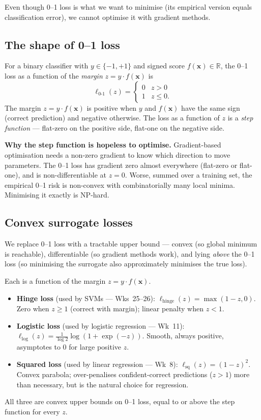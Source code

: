 \documentclass[11pt, a4paper]{article}
\begin{document}
Even though 0--1 loss is what we want to minimise (its empirical version equals classification error), we cannot optimise it with gradient methods.

\subsection{The shape of 0--1 loss}

For a binary classifier with $y \in \{-1, +1\}$ and signed score $f(\mathbf{x}) \in \mathbb{R}$, the 0--1 loss as a function of the \emph{margin} $z = y \cdot f(\mathbf{x})$ is
\[
\ell_{0\text{-}1}(z) = \begin{cases} 0 & z > 0 \\ 1 & z \le 0. \end{cases}
\]
The margin $z = y \cdot f(\mathbf{x})$ is positive when $y$ and $f(\mathbf{x})$ have the same sign (correct prediction) and negative otherwise. The loss as a function of $z$ is a \emph{step function} — flat-zero on the positive side, flat-one on the negative side.

\begin{notebox}
\textbf{Why the step function is hopeless to optimise.} Gradient-based optimisation needs a non-zero gradient to know which direction to move parameters. The 0--1 loss has gradient zero almost everywhere (flat-zero or flat-one), and is non-differentiable at $z = 0$. Worse, summed over a training set, the empirical 0--1 risk is non-convex with combinatorially many local minima. Minimising it exactly is NP-hard.
\end{notebox}

\subsection{Convex surrogate losses}

We replace 0--1 loss with a tractable upper bound — convex (so global minimum is reachable), differentiable (so gradient methods work), and lying \emph{above} the 0--1 loss (so minimising the surrogate also approximately minimises the true loss).

\begin{defbox}
Each is a function of the margin $z = y \cdot f(\mathbf{x})$.
\begin{itemize}
  \item \textbf{Hinge loss} (used by SVMs — Wks~25--26): $\ell_{\text{hinge}}(z) = \max(1 - z, 0)$. Zero when $z \ge 1$ (correct with margin); linear penalty when $z < 1$.
  \item \textbf{Logistic loss} (used by logistic regression — Wk~11): $\ell_{\text{log}}(z) = \frac{1}{\log 2}\log(1 + \exp(-z))$. Smooth, always positive, asymptotes to $0$ for large positive $z$.
  \item \textbf{Squared loss} (used by linear regression — Wk~8): $\ell_{\text{sq}}(z) = (1 - z)^2$. Convex parabola; over-penalises confident-correct predictions ($z > 1$) more than necessary, but is the natural choice for regression.
\end{itemize}
All three are convex upper bounds on 0--1 loss, equal to or above the step function for every $z$.
\end{defbox}
\end{document}
